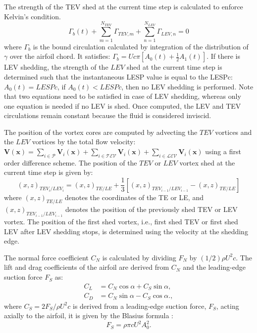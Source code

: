 \documentclass[a4paper,12pt]{article}
\begin{document}
The strength of the TEV shed at the current time step is calculated to enforce Kelvin’s condition.
\begin{equation}
    \Gamma_b(t) + \sum_{m=1}^{N_{TEV}} \Gamma_{TEV,m} + \sum_{n=1}^{N_{LEV}} \Gamma_{LEV,n} = 0
    \label{eq:kelvin_circulation}
\end{equation}
where $\Gamma_b$ is the bound circulation calculated by integration of the distribution of $\gamma$ over the airfoil chord. It satisfies:
    $\Gamma_b = U c \pi \left[ A_0(t) + \frac{1}{2} A_1(t) \right]$.
If there is LEV shedding, the strength  of the $LEV$ shed at the current time step is determined such that  the instantaneous LESP value is equal to the LESPc: $A_0(t)=LESPc$, if $A_0(t)<LESPc$, then no LEV shedding is performed.
Note that two equations need to be satisfied in case of LEV shedding, whereas only one equation is needed if no LEV is shed.
Once computed, the LEV and TEV circulations remain constant because the fluid is considered inviscid.

The position of the vortex cores are computed by advecting the $TEV$ vortices and the $LEV$ vortices  by the 
total flow velocity: $\textbf{V}(\textbf{x})= \sum_{i\in \mathcal{P}} \textbf{V}_{i}(\textbf{x}) + \sum_{i\in \mathcal{TEV}} \textbf{V}_{i}(\textbf{x}) + \sum_{i\in \mathcal{LEV}} \textbf{V}_{i}(\textbf{x})$ using a first order difference scheme.
The position of the $TEV$ or $LEV$ vortex shed at the current time step is given by:
\begin{equation}
    (x, z)_{TEV_i/LEV_i} = (x, z)_{TE/LE} + \frac{1}{3} \left[ (x, z)_{TEV_{i-1}/LEV_{i-1}} - (x, z)_{TE/LE} \right]
\end{equation}
where $(x, z)_{TE/LE}$ denotes the coordinates of the TE or LE, and $(x, z)_{TEV_{i-1}/LEV_{i-1}}$ denotes the position of the previously shed TEV or LEV vortex. The position of the first shed vortex, i.e., first shed TEV or first shed LEV after LEV shedding stops, is determined using the velocity at the shedding edge.



The normal force coefficient $C_N$ is calculated by dividing $F_N$ by $(1/2)\rho U^2 c$. The lift and drag coefficients of the airfoil are derived from $C_N$ and the leading-edge suction force $F_S$ as:
\begin{align}
    C_L &= C_N \cos\alpha + C_S \sin\alpha, \label{eq:CL}\\
    C_D &= C_N \sin\alpha - C_S \cos\alpha. \label{eq:CD},
\end{align}
where $C_S=2F_S/\rho U^2c$ is derived from a leading-edge suction force, $F_S$, acting axially to the airfoil, it is given by the Blasius formula \citep{ramesh2014discrete}:
\begin{equation}
    F_S = \rho \pi c U^2 A_0^2.
    \label{eq:FS_blasius}
\end{equation}
\end{document}
